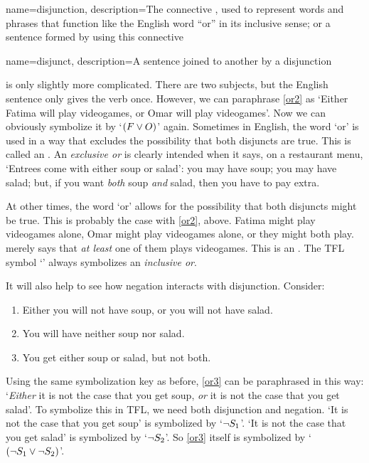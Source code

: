 {
name=disjunction,
description={The connective \eor, used to represent words and phrases that function like the English word ``or'' in its inclusive sense; or a sentence formed by using this connective}
}

{
name=disjunct,
description={A sentence joined to another by a \gls{disjunction}}
}

 is only slightly more complicated. There are two subjects, but the English sentence only gives the verb once. However, we can paraphrase \cref*{or2} as `Either Fatima will play videogames, or Omar will play videogames'. Now we can obviously symbolize it by `$(F \vee O)$' again.
Sometimes in English, the word `or' is used in a way that excludes the possibility that both disjuncts are true. This is called an .  An \emph{exclusive or} is clearly intended when it says, on a restaurant menu, `Entrees come with either soup or salad': you may have soup; you may have salad; but, if you want \emph{both} soup \emph{and} salad, then you have to pay extra.

At other times, the word `or' allows for the possibility that both disjuncts might be true. This is probably the case with \cref{or2}, above. Fatima might play videogames alone, Omar might play videogames alone, or they might both play.  merely says that \emph{at least} one of them plays videogames. This is an . The TFL symbol `\eor' always symbolizes an \emph{inclusive or}.

It will also help to see how negation interacts with disjunction. Consider: 
	\begin{enumerate}
		\item\label{or3} Either you will not have soup, or you will not have salad.
		\item\label{or4} You will have neither soup nor salad.
		\item\label{or.xor} You get either soup or salad, but not both.
	\end{enumerate}
Using the same symbolization key as before, \cref*{or3} can be paraphrased in this way: `\emph{Either} it is not the case that you get soup, \emph{or} it is not the case that you get salad'. To symbolize this in TFL, we need both disjunction and negation. `It is not the case that you get soup' is symbolized by `$\neg S_1$'. `It is not the case that you get salad' is symbolized by `$\neg S_2$'. So \cref*{or3} itself is symbolized by `$(\neg S_1 \vee \neg S_2)$'.

